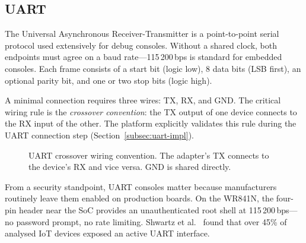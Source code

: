 \subsection{UART}\label{subsec:uart-protocol}

The Universal Asynchronous Receiver-Transmitter is a point-to-point serial protocol used extensively for debug consoles. Without a shared clock, both endpoints must agree on a baud rate---115\,200\,bps is standard for embedded consoles. Each frame consists of a start bit (logic low), 8 data bits (LSB first), an optional parity bit, and one or two stop bits (logic high).

A minimal connection requires three wires: TX, RX, and GND. The critical wiring rule is the \emph{crossover convention}: the TX output of one device connects to the RX input of the other. The \pcbctf{} platform explicitly validates this rule during the UART connection step (Section~\ref{subsec:uart-impl}).

\begin{figure}[ht]
    \centering
    \caption{UART crossover wiring convention. The adapter's TX connects to the device's RX and vice versa. GND is shared directly.}
    \label{fig:uart-crossover}
\end{figure}

From a security standpoint, UART consoles matter because manufacturers routinely leave them enabled on production boards. On the WR841N, the four-pin header near the SoC provides an unauthenticated root shell at 115\,200\,bps---no password prompt, no rate limiting. Shwartz et al.~\cite{shwartz2017} found that over 45\% of analysed IoT devices exposed an active UART interface.

